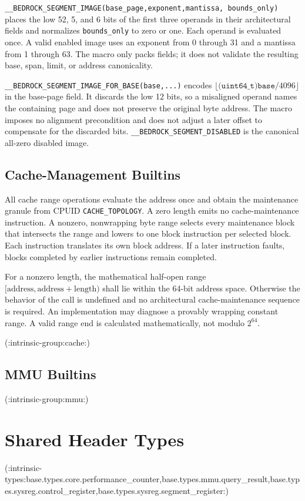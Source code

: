 \documentclass[10pt,twoside]{article}
\begin{document}
\texttt{\_\_BEDROCK\_SEGMENT\_IMAGE(base\_page,exponent,mantissa,
bounds\_only)} places the low 52, 5, and 6 bits of the first three operands in
their architectural fields and normalizes \texttt{bounds\_only} to zero or
one. Each operand is evaluated once. A valid enabled image uses an exponent
from 0 through 31 and a mantissa from 1 through 63. The macro only packs
fields; it does not validate the resulting base, span, limit, or address
canonicality.

\texttt{\_\_BEDROCK\_SEGMENT\_IMAGE\_FOR\_BASE(base,...)} encodes
$\lfloor\texttt{(uint64\_t)base}/4096\rfloor$ in the base-page field. It
discards the low 12 bits, so a misaligned operand names the containing page and
does not preserve the original byte address. The macro imposes no alignment
precondition and does not adjust a later offset to compensate for the discarded
bits. \texttt{\_\_BEDROCK\_SEGMENT\_DISABLED} is the canonical all-zero
disabled image.

\subsection{Cache-Management Builtins}
All cache range operations evaluate the address once and obtain the maintenance granule from CPUID
\texttt{CACHE\_TOPOLOGY}. A zero length emits no cache-maintenance instruction. A nonzero, nonwrapping byte range
selects every maintenance block that intersects the range and lowers to one block instruction per selected block.
Each instruction translates its own block address. If a later instruction faults, blocks completed by earlier
instructions remain completed.

For a nonzero length, the mathematical half-open range
$[\mathrm{address},\mathrm{address}+\mathrm{length})$ shall lie within the
64-bit address space. Otherwise the behavior of the call is undefined and no
architectural cache-maintenance sequence is required. An implementation may
diagnose a provably wrapping constant range. A valid range end is calculated
mathematically, not modulo $2^{64}$.

(:intrinsic-group:cache:)

\subsection{MMU Builtins}
(:intrinsic-group:mmu:)

\section{Shared Header Types}\label{page:shared-header-types}
(:intrinsic-types:base.types.core.performance_counter,base.types.mmu.query_result,base.types.sysreg.control_register,base.types.sysreg.segment_register:)
\end{document}
